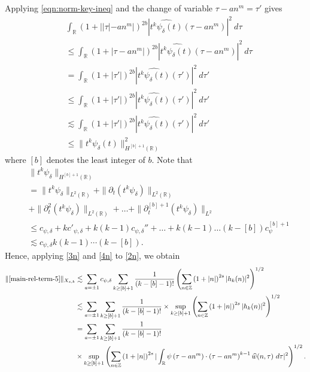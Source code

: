\documentclass[12pt,reqno]{amsart}
\numberwithin{equation}{section}  %
\newcommand{\rr}{\mathbb{R}}
\newcommand{\zz}{\mathbb{Z}}
\newcommand{\wh}{\widehat}
\newcommand{\p}{\partial}
\begin{document}
%
%
Applying \eqref{eqn:norm-key-ineq} and the change
of variable $\tau - an^{m } = \tau'$
gives
%
%
\begin{equation}
	\label{3n}
	\begin{split}
		& \int_\rr \left( 1 + | |\tau| - an^{m } | \right)^{2b} | \wh{t^{k}
		\psi_{\delta}(t)}\left( \tau - an^{m } \right) |^2 \ d \tau
    \\
    & \le \int_\rr \left( 1 + | \tau - an^{m } | \right)^{2b} | \wh{t^{k}
		\psi_{\delta}(t)}\left( \tau - an^{m } \right) |^2 \ d \tau
		\\
    & = \int_\rr \left( 1 + |\tau'| \right)^{2b} | \wh{t^k \psi_{\delta}(t)}(\tau') |^2 \
		d \tau'
		\\
    & \le \int_\rr \left( 1 + |\tau'| \right)^{2b} | \wh{t^k \psi_{\delta}(t)}(\tau')
		|^2 \ d \tau'
		\\
    & \lesssim \int_\rr \left( 1 + | \tau' | \right)^{2b}| \wh{t^{k}
		\psi_{\delta}(t)}(\tau') |^2 \ d \tau'
		\\
    & \le \|t^k \psi_{\delta}(t) \|_{H^{[b] + 1}(\rr)}^2
	\end{split}
\end{equation}
%
where $[b]$ denotes the least integer of $b$. Note that
%
%
\begin{equation}
	\label{4n}
	\begin{split}
    & \|t^k \psi_{\delta} \|_{H^{[b] +1}(\rr)}
		\\
    & = \|t^k \psi_{\delta}\|_{L^2(\rr)} + \|\p_t (t^k \psi_{\delta} )
    \|_{L^2(\rr)} 
    \\
    & + \| \p_{t}^{2} (t^{k} \psi_{\delta}) \|_{L^{2}(\rr)} + \ldots + \|
    \p_{t}^{[b] + 1} (t^{k} \psi_{\delta})\|_{L^{2}}
    \\
    & \le c_{\psi, \delta} + k c'_{\psi, \delta} + k (k -1) c_{\psi, \delta}'' + \ldots +
    k(k-1) \ldots (k - [b]) c_{\psi}^{[b] + 1}
    \\
    & \lesssim c_{\psi, \delta} k(k-1) \cdots (k - [b]).
	\end{split}
\end{equation}
%
%
Hence, applying \eqref{3n} and \eqref{4n} to \eqref{2n}, we obtain
%
\begin{equation}
	\label{5n}
	\begin{split}
		\|\eqref{main-rel-term-5} \|_{X_{s,b}}
		& \lesssim \sum_{a = \pm 1}
    c_{\psi, \delta}\sum_{k \ge [b] +1} \frac{1}{(k-[b] - 1)!} \left( \sum_{n \in \zz} \left (1 + |n| \right )^{2s} | h_k(n) |^2 
		\right)^{1/2}
		\\
		& \lesssim  \sum_{a = \pm 1} \sum_{k \ge [b] +1} \frac{1}{(k-[b] - 1)!}
    \times \sup_{k \ge [b] + 1} \left( \sum_{n \in \zz} \left (1 + |n| \right )^{2s} | 
		h_k(n) |^2 \right)^{1/2}
		\\
		& = \sum_{a = \pm 1}\sum_{k \ge [b] +1} \frac{1}{(k-[b] - 1)!}
    \\
    & \times \sup_{k \ge [b] + 1} 
		\left( \sum_{n \in \zz} \left (1 + |n| \right )^{2s} |\int_\rr 
		\psi\left( \tau - an^{m } \right) \cdot \left( \tau - an^{m } 
    \right)^{k -1} \wh{w}(n, \tau) \ d \tau|^{2} \right)^{1/2}.
    \end{split}
\end{equation}
\end{document}
